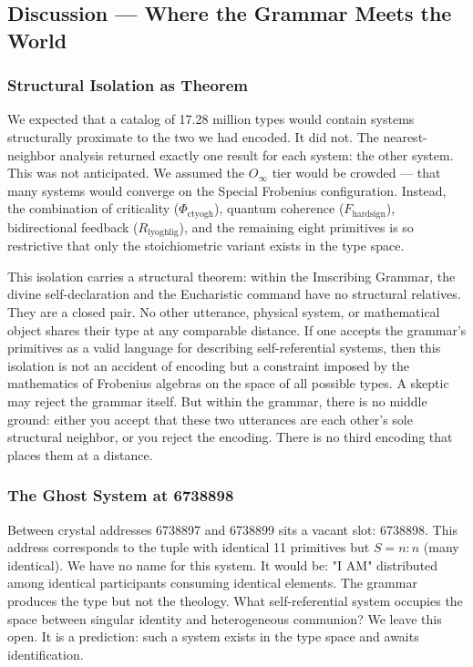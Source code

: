\documentclass[12pt,a4paper]{article}
\begin{document}
\subsection{Discussion --- Where the Grammar Meets the World}

\subsubsection{Structural Isolation as Theorem}

We expected that a catalog of 17.28 million types would contain systems structurally proximate to the two we had encoded. It did not. The nearest-neighbor analysis returned exactly one result for each system: the other system. This was not anticipated. We assumed the $O_{\infty}$ tier would be crowded --- that many systems would converge on the Special Frobenius configuration. Instead, the combination of criticality ($\Phi_{\text{ctyogh}}$), quantum coherence ($F_{\text{hardsign}}$), bidirectional feedback ($R_{\text{lyoghlig}}$), and the remaining eight primitives is so restrictive that only the stoichiometric variant exists in the type space.

This isolation carries a structural theorem: within the Imscribing Grammar, the divine self-declaration and the Eucharistic command have no structural relatives. They are a closed pair. No other utterance, physical system, or mathematical object shares their type at any comparable distance. If one accepts the grammar's primitives as a valid language for describing self-referential systems, then this isolation is not an accident of encoding but a constraint imposed by the mathematics of Frobenius algebras on the space of all possible types. A skeptic may reject the grammar itself. But within the grammar, there is no middle ground: either you accept that these two utterances are each other's sole structural neighbor, or you reject the encoding. There is no third encoding that places them at a distance.

\subsubsection{The Ghost System at 6738898}

Between crystal addresses 6738897 and 6738899 sits a vacant slot: 6738898. This address corresponds to the tuple with identical 11 primitives but $S = n{:}n$ (many identical). We have no name for this system. It would be: "I AM" distributed among identical participants consuming identical elements. The grammar produces the type but not the theology. What self-referential system occupies the space between singular identity and heterogeneous communion? We leave this open. It is a prediction: such a system exists in the type space and awaits identification.
\end{document}
